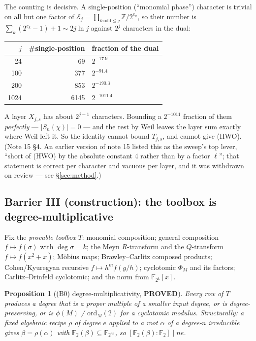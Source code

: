 \documentclass[10pt]{article}
\theoremstyle{plain}
\newtheorem{proposition}[theorem]{Proposition}
\theoremstyle{definition}
\newcommand{\F}{\mathbb F}
\newcommand{\Z}{\mathbb Z}
\newcommand{\E}{\mathcal E}
\newcommand{\proved}{\textcolor{proved}{\textsf{\textbf{\footnotesize PROVED}}}}
\begin{document}
The counting is decisive. A single-position (``monomial phase'') character is
trivial on all but one factor of
$\E_j=\prod_{k\ \mathrm{odd}\le j}\Z/2^{e_k}$, so their number is
$\sum_k(2^{e_k}-1)+1\sim2j\ln j$ against $2^j$ characters in the dual:

\begin{center}\small
\begin{tabular}{rrl}
\hline
$j$ & \#single-position & fraction of the dual\\
\hline
24 & 69 & $2^{-17.9}$\\
100 & 377 & $2^{-91.4}$\\
200 & 853 & $2^{-190.3}$\\
1024 & 6145 & $2^{-1011.4}$\\
\hline
\end{tabular}
\end{center}

A layer $X_{j,s}$ has about $2^{j-1}$ characters. Bounding a $2^{-1011}$
fraction of them \emph{perfectly} --- $|S_n(\chi)|=0$ --- and the rest by Weil
leaves the layer sum exactly where Weil left it. So the identity cannot bound
$T_{j,s}$, and cannot give (HWO). (Note 15 \S4. An earlier version of note 15
listed this as the sweep's top lever, ``short of (HWO) by the absolute constant
4 rather than by a factor $\ell$''; that statement is correct per character and
vacuous per layer, and it was withdrawn on review --- see \S\ref{sec:method}.)

\subsection{Barrier III (construction): the toolbox is degree-multiplicative}
\label{sec:bar3}

Fix the \emph{provable toolbox} $T$: monomial composition; general composition
$f\mapsto f(\sigma)$ with $\deg\sigma=k$; the Meyn $R$-transform and the
$Q$-transform $f\mapsto f(x^2+x)$; M\"obius maps; Brawley--Carlitz composed
products; Cohen/Kyuregyan recursive $f\mapsto h^mf(g/h)$; cyclotomic $\Phi_M$
and its factors; Carlitz--Drinfeld cyclotomic; and the norm from $\F_{2^k}[x]$.

\begin{proposition}[(B0) degree-multiplicativity, \proved]
Every row of $T$ produces a degree that is a proper multiple of a smaller input
degree, or is degree-preserving, or is $\phi(M)$ / $\mathrm{ord}_M(2)$ for a
cyclotomic modulus. Structurally: a fixed algebraic recipe $\rho$ of degree $e$
applied to a root $\alpha$ of a degree-$n$ irreducible gives
$\beta=\rho(\alpha)$ with $\F_2(\beta)\subseteq\F_{2^{ne}}$, so
$[\F_2(\beta):\F_2]\mid ne$.
\end{proposition}
\end{document}
